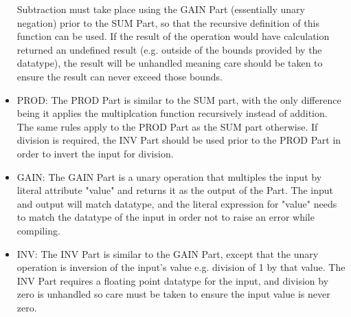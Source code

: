 \documentclass[titlepage]{article}
\begin{document}
\begin{itemize}[label={}]
Subtraction must take place using the GAIN Part (essentially unary negation) prior to the SUM Part, so that the recursive definition of this function can be used.
If the result of the operation would have calculation returned an undefined result (e.g. outside of the bounds provided by the datatype), the result will be unhandled meaning care should be taken to ensure the result can never exceed those bounds.
    \item PROD:
The PROD Part is similar to the SUM part, with the only difference being it applies the multiplcation function recursively instead of addition.
The same rules apply to the PROD Part as the SUM part otherwise.
If division is required, the INV Part should be used prior to the PROD Part in order to invert the input for division.
    \item GAIN:
The GAIN Part is a unary operation that multiples the input by literal attribute "value" and returns it as the output of the Part.
The input and output will match datatype, and the literal expression for "value" needs to match the datatype of the input in order not to raise an error while compiling.
    \item INV:
The INV Part is similar to the GAIN Part, except that the unary operation is inversion of the input's value e.g. division of 1 by that value.
The INV Part requires a floating point datatype for the input, and division by zero is unhandled so care must be taken to ensure the input value is never zero.
\end{itemize}
\end{document}
